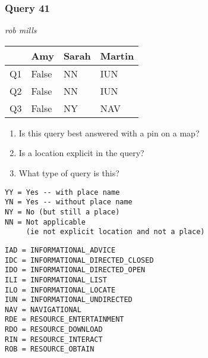 \begin{frame}[fragile]
\frametitle{Query 41}
\vspace{1em}

\emph{rob mills}

\vfill

\begin{table}
  \centering
  \begin{tabular}{ l l l l }
    & \textbf{Amy} & \textbf{Sarah} & \textbf{Martin}\\
    \toprule
    Q1 & False & NN & IUN\\
Q2 & False & NN & IUN\\
Q3 & False & NY & NAV\\
    \bottomrule
  \end{tabular}
\end{table}

\vfill

\tiny{

\begin{enumerate}
\item Is this query best answered with a pin on a map?
\item Is a location explicit in the query?
\item What type of query is this?
\end{enumerate}

\vfill

\begin{multicols}{2}
\begin{verbatim}
YY = Yes -- with place name
YN = Yes -- without place name
NY = No (but still a place)
NN = Not applicable 
     (ie not explicit location and not a place)
\end{verbatim}

\columnbreak
\begin{verbatim}
IAD = INFORMATIONAL_ADVICE
IDC = INFORMATIONAL_DIRECTED_CLOSED
IDO = INFORMATIONAL_DIRECTED_OPEN
ILI = INFORMATIONAL_LIST
ILO = INFORMATIONAL_LOCATE
IUN = INFORMATIONAL_UNDIRECTED
NAV = NAVIGATIONAL
RDE = RESOURCE_ENTERTAINMENT
RDO = RESOURCE_DOWNLOAD
RIN = RESOURCE_INTERACT
ROB = RESOURCE_OBTAIN
\end{verbatim}
\end{multicols}
}

\end{frame}


